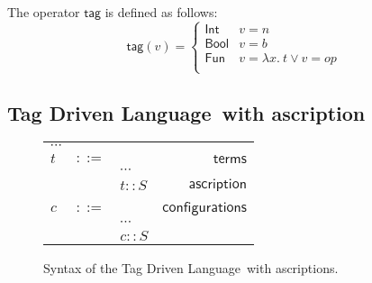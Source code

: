 \documentclass[preprint,authoryear,sort&compress,9pt,nocopyrightspace]{article}
\newcommand{\ascripS}[1]{#1::S}
\newcommand{\absST}[2]{\lambda #1. \ #2}
\newcommand{\lab}{\mathsf{tag}}
\newcommand{\boolt}{\mathsf{Bool}}
\newcommand{\intt}{\mathsf{Int}}
\newcommand{\funt}{\mathsf{Fun}}
\newcommand{\semanticB}{Tag Driven Language}
\begin{document}
\begin{definition}[$\lab$]
\label{definition:tcs}
\mbox{}
The operator $\lab$ is defined  as follows:
\[ \lab(v) = \begin{cases} 
      \intt & v = n \\
      \boolt & v = b \\
      \funt & v = \absST{x}{t} \vee v = op\\
   \end{cases}
\]
\end{definition}







\subsection{\semanticB \ with ascription}

\begin{figure}[h]
\begin{small}
\begin{center}
\hspace*{-2cm}
\begin{tabular}{|l c l r|}
\hline
$\cdots$&&&\\
$t$&$::=$&&$\mathsf {terms}$\\
&&$\cdots$&\\
&&$\ascripS{t}$&$\mathsf {ascription}$\\
&&&\\
$c$&$::=$&&$\mathsf {configurations}$\\
&&$\cdots$&\\
&&$\ascripS{c}$&\\
\hline
\end{tabular}
\hspace*{-2cm}
\caption{Syntax of the \semanticB \ with ascriptions.}
\label{figure:SYNTAXASCRIP}
\end{center}
\end{small}
\end{figure}
\end{document}

